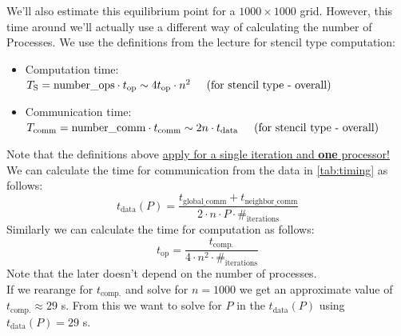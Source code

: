 We'll also estimate this equilibrium point for a $1000\times1000$ grid. However, this time around we'll actually use a different way of calculating the number of Processes. We use the definitions from the lecture for stencil type computation: 
\begin{itemize}
    \item Computation time: $T_{\text{S}} = \text{number\_ops} \cdot t_\text{op} \sim  4 t_\text{op} \cdot n^2 \hspace{5mm} \text{(for stencil type - overall)}$
    \item Communication time: $T_{\text{comm}} = \text{number\_comm} \cdot t_\text{comm} \sim 2 n \cdot t_\text{data}\hspace{5mm} \text{(for stencil type - overall)}$
\end{itemize}
Note that the definitions above \underline{apply for a single iteration and \textbf{one} processor!}\\
We can calculate the time for communication from the data in \autoref{tab:timing} as follows: 
\[t_\text{data}(P) = \frac{t_\text{global\_comm}+t_\text{neighbor\_comm}}{2\cdot n \cdot P \cdot \#_\text{{iterations}}}\]
Similarly we can calculate the time for computation as follows:
\[t_\text{op} = \frac{t_\text{comp.}}{4 \cdot n^2 \cdot \#_\text{{iterations}}}\]
Note that the later doesn't depend on the number of processes.\\
If we rearange for $t_{\text{comp.}}$ and solve for $n=1000$ we get an approximate value of $t_{\text{comp.}}\approx 29$ s. From this we want to solve for $P$ in the $t_\text{data}(P)$ using $t_\text{data}(P) = 29$ s. 


